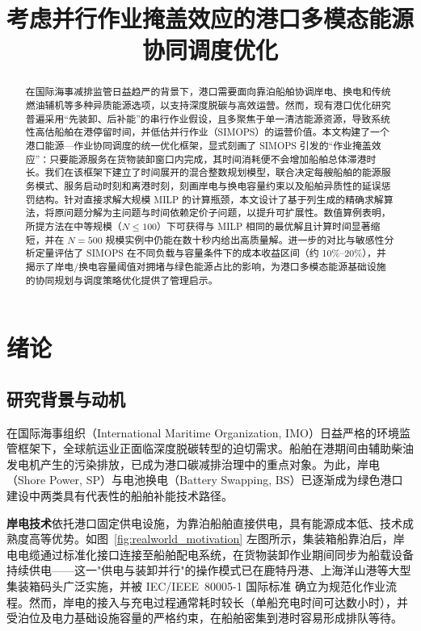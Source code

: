 \documentclass[UTF8, a4paper, 12pt]{ctexart}
\begin{document}
\title{\heiti{} 考虑并行作业掩盖效应的港口多模态能源协同调度优化}
\author{}
\date{}
\maketitle

\begin{abstract}
在国际海事减排监管日益趋严的背景下，港口需要面向靠泊船舶协调岸电、换电和传统燃油辅机等多种异质能源选项，以支持深度脱碳与高效运营。然而，现有港口优化研究普遍采用“先装卸、后补能”的串行作业假设，且多聚焦于单一清洁能源资源，导致系统性高估船舶在港停留时间，并低估并行作业（SIMOPS）的运营价值。本文构建了一个港口能源—作业协同调度的统一优化框架，显式刻画了 SIMOPS 引发的“作业掩盖效应”：只要能源服务在货物装卸窗口内完成，其时间消耗便不会增加船舶总体滞港时长。我们在该框架下建立了时间展开的混合整数规划模型，联合决定每艘船舶的能源服务模式、服务启动时刻和离港时刻，刻画岸电与换电容量约束以及船舶异质性的延误惩罚结构。针对直接求解大规模 MILP 的计算瓶颈，本文设计了基于列生成的精确求解算法，将原问题分解为主问题与时间依赖定价子问题，以提升可扩展性。数值算例表明，所提方法在中等规模（$N \le 100$）下可获得与 MILP 相同的最优解且计算时间显著缩短，并在 $N = 500$ 规模实例中仍能在数十秒内给出高质量解。进一步的对比与敏感性分析定量评估了 SIMOPS 在不同负载与容量条件下的成本收益区间（约 10\%–20\%），并揭示了岸电/换电容量阈值对拥堵与绿色能源占比的影响，为港口多模态能源基础设施的协同规划与调度策略优化提供了管理启示。
\end{abstract}

\section{绪论}
\label{sec:intro}

\subsection{研究背景与动机}
在国际海事组织（International Maritime Organization, IMO）日益严格的环境监管框架下，全球航运业正面临深度脱碳转型的迫切需求。船舶在港期间由辅助柴油发电机产生的污染排放，已成为港口碳减排治理中的重点对象。为此，岸电（Shore Power, SP）与电池换电（Battery Swapping, BS）已逐渐成为绿色港口建设中两类具有代表性的船舶补能技术路径。

\textbf{岸电技术}依托港口固定供电设施，为靠泊船舶直接供电，具有能源成本低、技术成熟度高等优势。如图~\ref{fig:realworld_motivation} 左图所示，集装箱船靠泊后，岸电电缆通过标准化接口连接至船舶配电系统，在货物装卸作业期间同步为船载设备持续供电——这一"供电与装卸并行"的操作模式已在鹿特丹港、上海洋山港等大型集装箱码头广泛实施，并被 IEC/IEEE~80005-1 国际标准 \cite{IEC80005} 确立为规范化作业流程。然而，岸电的接入与充电过程通常耗时较长（单船充电时间可达数小时），并受泊位及电力基础设施容量的严格约束，在船舶密集到港时容易形成排队等待。
\end{document}
